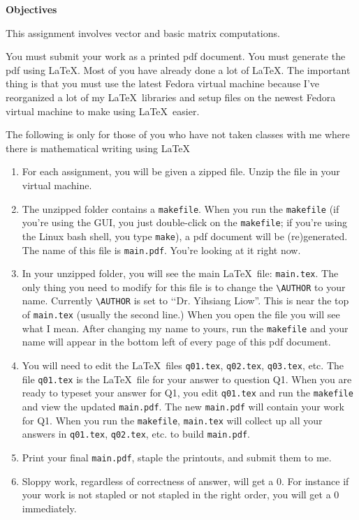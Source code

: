 
\renewcommand\AUTHOR{David Campbell}
\renewcommand\COURSENAME{Computer Graphics}
\renewcommand\COURSESHORTNAME{Computer Graphics}
\renewcommand\COURSENUMBER{CISS380}
\renewcommand\TITLE{Assignment 3}


\newcommand\vv[2]{ \langle #1, #2 \rangle }
\topmatter

{\bf Objectives}

This assignment involves vector and basic matrix computations.

You must submit your work as a printed pdf document.
You must generate the pdf using \LaTeX.
Most of you have already done a lot of \LaTeX.
The important thing is that you must use the latest 
Fedora virtual machine because I've reorganized a lot of my 
\LaTeX\ libraries and setup files on the newest 
Fedora virtual machine to make using \LaTeX\ easier.

The following is only for those of you who have not taken classes 
with me where there is mathematical writing using
\LaTeX\:
\begin{enumerate}
\item For each assignment, you will be given a zipped file.
      Unzip the file in your virtual machine.
\item The unzipped folder contains a \verb!makefile!.
      When you run the \verb!makefile! (if you're using the GUI, you just
      double-click on the \verb!makefile!; if you're using the  
      Linux bash shell, you type \verb!make!), a pdf document 
      will be (re)generated.
      The name of this file is \verb!main.pdf!.
      You're looking at it right now.
\item In your unzipped folder, you will see the main \LaTeX\ file:
      \verb!main.tex!.
      The only thing you need to modify for this file is to change the 
      \verb!\AUTHOR! to your name.
      Currently \verb!\AUTHOR! is set to \lq\lq Dr. Yihsiang Liow''.
      This is near the top of \verb!main.tex! (usually the second line.)
      When you open the file you will see what I mean.
      After changing my name to yours, run the \verb!makefile! and
      your name will appear in the bottom left of every page of this 
      pdf document.
\item You will need to edit the \LaTeX\ files 
      \verb!q01.tex!,
      \verb!q02.tex!,
      \verb!q03.tex!, etc.
      The file \verb!q01.tex! is the \LaTeX\ file for 
      your answer to question Q1. 
      When you are ready to typeset your answer for Q1,
      you edit \verb!q01.tex! and run the \verb!makefile!
      and view the updated \verb!main.pdf!.
      The new \verb!main.pdf! will contain your work for Q1.
      When you run the \verb!makefile!, \verb!main.tex! will collect up
      all your answers in \verb!q01.tex!, \verb!q02.tex!, etc. to build
      \verb!main.pdf!.
\item Print your final \verb!main.pdf!, staple the printouts, and submit
      them to me. 
\item Sloppy work, regardless of correctness of answer, will get a 0.
      For instance if your work is not stapled or not stapled in the 
      right order, you will get a 0 immediately.
\end{enumerate}


